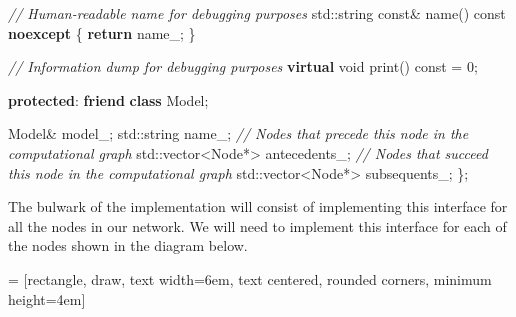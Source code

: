 \documentclass[
]{article}
\newenvironment{Shaded}{}{}
\newcommand{\AttributeTok}[1]{\textcolor[rgb]{0.49,0.56,0.16}{#1}}
\newcommand{\BuiltInTok}[1]{#1}
\newcommand{\CommentTok}[1]{\textcolor[rgb]{0.38,0.63,0.69}{\textit{#1}}}
\newcommand{\ControlFlowTok}[1]{\textcolor[rgb]{0.00,0.44,0.13}{\textbf{#1}}}
\newcommand{\DataTypeTok}[1]{\textcolor[rgb]{0.56,0.13,0.00}{#1}}
\newcommand{\DecValTok}[1]{\textcolor[rgb]{0.25,0.63,0.44}{#1}}
\newcommand{\KeywordTok}[1]{\textcolor[rgb]{0.00,0.44,0.13}{\textbf{#1}}}
\newcommand{\NormalTok}[1]{#1}
\newcommand{\VariableTok}[1]{\textcolor[rgb]{0.10,0.09,0.49}{#1}}
\begin{document}
\begin{Shaded}
\begin{Highlighting}[]
    \CommentTok{// Human{-}readable name for debugging purposes}
    \BuiltInTok{std::}\NormalTok{string }\AttributeTok{const}\NormalTok{\& name() }\AttributeTok{const} \KeywordTok{noexcept}\NormalTok{ \{ }\ControlFlowTok{return} \VariableTok{name\_}\NormalTok{; \}}
    
    \CommentTok{// Information dump for debugging purposes}
    \KeywordTok{virtual} \DataTypeTok{void}\NormalTok{ print() }\AttributeTok{const}\NormalTok{ = }\DecValTok{0}\NormalTok{;}

\KeywordTok{protected}\NormalTok{:}
    \KeywordTok{friend} \KeywordTok{class}\NormalTok{ Model;}
    
\NormalTok{    Model\& }\VariableTok{model\_}\NormalTok{;}
    \BuiltInTok{std::}\NormalTok{string }\VariableTok{name\_}\NormalTok{;}
    \CommentTok{// Nodes that precede this node in the computational graph}
    \BuiltInTok{std::}\NormalTok{vector\textless{}Node*\textgreater{} }\VariableTok{antecedents\_}\NormalTok{;}
    \CommentTok{// Nodes that succeed this node in the computational graph}
    \BuiltInTok{std::}\NormalTok{vector\textless{}Node*\textgreater{} }\VariableTok{subsequents\_}\NormalTok{;}
\NormalTok{\};}
\end{Highlighting}
\end{Shaded}

The bulwark of the implementation will consist of implementing this
interface for all the nodes in our network. We will need to implement
this interface for each of the nodes shown in the diagram below.

\begin{center}

 = [rectangle, draw, text width=6em, text centered, rounded corners, minimum height=4em]

\end{center}
\end{document}
